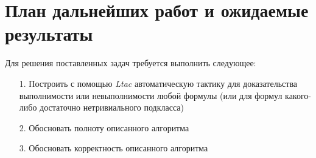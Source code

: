 \documentclass[12pt]{article}
\begin{document}


\section{План дальнейших работ и ожидаемые результаты}
Для решения поставленных задач требуется выполнить следующее:
\begin{enumerate}
    
    \item[1.] Построить с помощью \textit{Ltac} автоматическую тактику для доказательства выполнимости или невыполнимости любой формулы (или для формул какого-либо достаточно нетривиального подкласса)
    \item[2.] Обосновать полноту описанного алгоритма
    \item[3.] Обосновать корректность описанного алгоритма

\end{enumerate}
\clearpage
\end{document}
